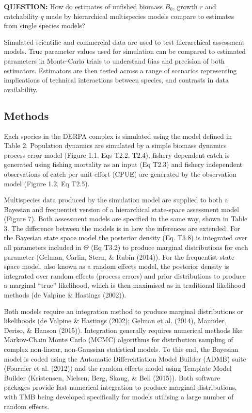 \documentclass[12pt,]{scrartcl}
\begin{document}
\textbf{QUESTION:} How do estimates of unfished biomass \(B_0\), growth
\(r\) and catchability \(q\) made by hierarchical multispecies models
compare to estimates from single species models?

Simulated scientific and commercial data are used to test hierarchical
assessment models. True parameter values used for simulation can be
compared to estimated parameters in Monte-Carlo trials to understand
bias and precision of both estimators. Estimators are then tested across
a range of scenarios representing implications of technical interactions
between species, and contrasts in data availability.

\subsection{Methods}\label{methods}

Each species in the DERPA complex is simulated using the model defined
in Table 2. Population dynamics are simulated by a simple biomass
dynamics process error-model (Figure 1.1, Eqs T2.2, T2.4), fishery
dependent catch is generated using fishing mortality as an input (Eq
T2.3) and fishery independent observations of catch per unit effort
(CPUE) are generated by the observation model (Figure 1.2, Eq T2.5).

Multispecies data produced by the simulation model are supplied to both
a Bayesian and frequentist version of a hierarchical state-space
assessment model (Figure 7). Both assessment models are specified in the
same way, shown in Table 3. The difference between the models is in how
the inferences are extended. For the Bayesian state space model the
posterior density (Eq. T3.8) is integrated over all parameters included
in \(\Theta\) (Eq T3.2) to produce marginal distributions for each
parameter (Gelman, Carlin, Stern, \& Rubin (2014)). For the frequentist
state space model, also known as a random effects model, the posterior
density is integrated over random effects (process errors) and prior
distributions to produce a marginal ``true'' likelihood, which is then
maximised as in traditional likelihood methods (de Valpine \& Hastings
(2002)).

Both models require an integration method to produce marginal
distributions or likelihoods (de Valpine \& Hastings (2002); Gelman et
al. (2014), Maunder, Deriso, \& Hanson (2015)). Integration generally
requires numerical methods like Markov-Chain Monte Carlo (MCMC)
algorithms for distribution sampling of complex non-linear, non-Gaussian
statistical models. To this end, the Bayesian model is coded using the
Automatic Differentiation Model Builder (ADMB) suite (Fournier et al.
(2012)) and the random effects model using Template Model Builder
(Kristensen, Nielsen, Berg, Skaug, \& Bell (2015)). Both software
packages provide fast numerical integration to produce marginal
distributions, with TMB being developed specifically for models
utilising a large number of random effects.
\end{document}
